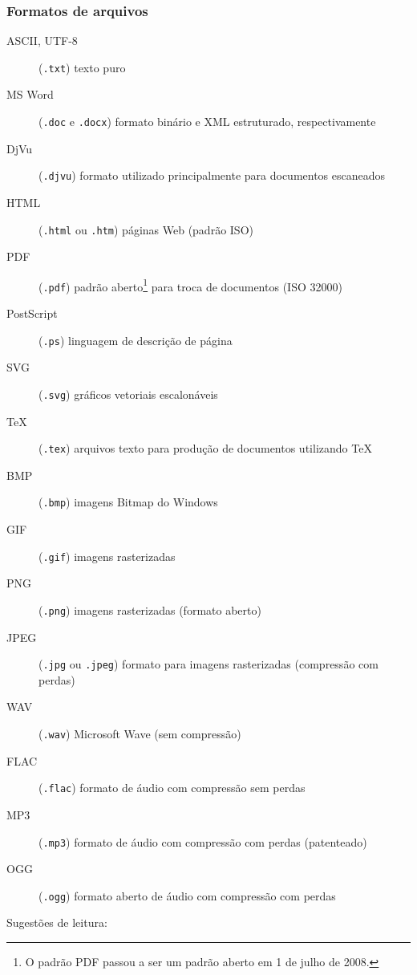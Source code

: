 
\begin{frame}[allowframebreaks]
\frametitle{Formatos de arquivos}
\begin{description}
\item[ASCII, UTF-8](\texttt{.txt}) texto puro 
\item[MS Word](\texttt{.doc} e \texttt{.docx}) formato binário e XML estruturado, respectivamente
\item[DjVu](\texttt{.djvu}) formato utilizado principalmente para documentos escaneados
\item[HTML](\texttt{.html} ou \texttt{.htm}) páginas Web (padrão ISO)
\item[PDF](\texttt{.pdf}) padrão aberto\footnote{O padrão PDF passou a ser um padrão aberto em 1 de julho de 2008.} para troca de documentos (ISO 32000)
\item[PostScript](\texttt{.ps}) linguagem de descrição de página
\item[SVG](\texttt{.svg}) gráficos vetoriais escalonáveis
\item[TeX](\texttt{.tex}) arquivos texto para produção de documentos utilizando \TeX{}
\item[BMP](\texttt{.bmp}) imagens Bitmap do Windows
\item[GIF](\texttt{.gif}) imagens rasterizadas 
\item[PNG](\texttt{.png}) imagens rasterizadas (formato aberto)
\item[JPEG](\texttt{.jpg} ou \texttt{.jpeg}) formato para imagens rasterizadas (compressão com perdas)
\item[WAV](\texttt{.wav}) Microsoft Wave (sem compressão)
\item[FLAC](\texttt{.flac}) formato de áudio com compressão sem perdas
\item[MP3](\texttt{.mp3}) formato de áudio com compressão com perdas (patenteado)
\item[OGG](\texttt{.ogg}) formato aberto de áudio com compressão com perdas 
\end{description}
\end{frame}



\begin{frame}
\small
Sugestões de leitura:
\vspace{2ex}



\end{frame}

